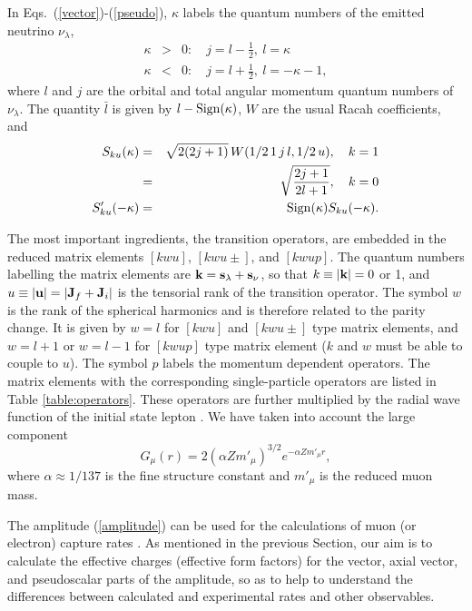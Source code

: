 In Eqs.\ (\ref{vector})-(\ref{pseudo}), $\kappa$ labels the 
quantum numbers of the emitted neutrino $\nu_\lambda$,
\begin{eqnarray}
  \kappa &>& 0:\quad j=l-\frac{1}{2},\ l=\kappa\\
  \kappa &<& 0:\quad j=l+\frac{1}{2},\ l=-\kappa-1,
\end{eqnarray}
where $l$ and $j$ are the orbital and total angular momentum quantum numbers
of $\nu_\lambda$.
The quantity $\bar l$ is given by $l-{\rm Sign}(\kappa)$, $W$ are the
usual Racah coefficients, and 
\begin{eqnarray}
  S_{ku}(\kappa)&=&\sqrt{2(2j+1)}\,W(1/2\,1\,j\,l,1/2\,u),\quad k=1
  \nonumber\\
  &=&\sqrt{\frac{2j+1}{2l+1}},\quad k=0\\
  S'_{ku}(-\kappa)&=&{\rm Sign}(\kappa)S_{ku}(-\kappa).\nonumber
\end{eqnarray}

The most important ingredients, the transition operators, are embedded in
the reduced matrix elements $[kwu]$, $[kwu\pm]$, and $[kwup]$. The
quantum numbers labelling the matrix elements are ${\bf k}={\bf
s}_\lambda+{\bf s}_\nu$, so that $k\equiv|{\bf k}|=0$ or 1, and $u\equiv 
|{\bf u}|=|
{\bf J}_f+ {\bf J}_i|$ is the tensorial rank of the transition operator. 
The symbol $w$ is the rank of the spherical harmonics and is therefore
related to the parity change. 
It is given by $w=l$ for $[kwu]$ and
$[kwu\pm]$ type matrix elements, and $w=l+1$ or $w=l-1$ for $[kwup]$ type
matrix element ($k$ and $w$ must be able to couple to $u$). 
The symbol $p$ labels the momentum
dependent operators. The matrix elements with the corresponding
single-particle operators are listed in Table \ref{table:operators}.
These operators are further multiplied by the radial wave function of the 
initial state lepton \cite{mor60}. We have taken into account the large 
component
\begin{equation}
  G_\mu(r)=2(\alpha Zm'_\mu)^{3/2}e^{-\alpha Zm'_\mu r},
\end{equation}
where $\alpha\approx 1/137$ is the fine structure constant and $m'_\mu$ is
the reduced muon mass. 

The amplitude (\ref{amplitude}) can be used for the calculations of muon (or
electron) capture rates \cite{sii98,mor60}. As mentioned in the 
previous Section,
our aim is to calculate the effective charges (effective form factors)
for the vector, axial vector, and
pseudoscalar parts of the amplitude, so as to help to understand the
differences between calculated and experimental rates and other observables.

